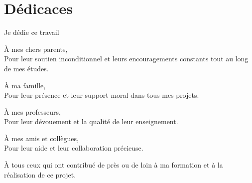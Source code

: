 \chapter*{Dédicaces}

\vspace{2cm}

\begin{center}
\Large{Je dédie ce travail}
\end{center}

\vspace{1cm}

À mes chers parents,\\
Pour leur soutien inconditionnel et leurs encouragements constants tout au long de mes études.

\vspace{0.5cm}

À ma famille,\\
Pour leur présence et leur support moral dans tous mes projets.

\vspace{0.5cm}

À mes professeurs,\\
Pour leur dévouement et la qualité de leur enseignement.

\vspace{0.5cm}

À mes amis et collègues,\\
Pour leur aide et leur collaboration précieuse.

\vspace{0.5cm}

À tous ceux qui ont contribué de près ou de loin à ma formation et à la réalisation de ce projet. 